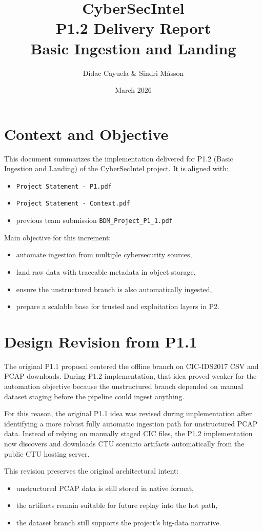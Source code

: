\documentclass[11pt,a4paper]{article}
\title{CyberSecIntel \\ P1.2 Delivery Report \\ Basic Ingestion and Landing}
\author{D\'idac Cayuela \& Sindri Másson}
\date{March 2026}
\begin{document}
\maketitle

\section{Context and Objective}
This document summarizes the implementation delivered for P1.2 (Basic Ingestion and Landing) of the CyberSecIntel project.
It is aligned with:
\begin{itemize}[leftmargin=1.5em]
  \item \texttt{Project Statement - P1.pdf}
  \item \texttt{Project Statement - Context.pdf}
  \item previous team submission \texttt{BDM\_Project\_P1\_1.pdf}
\end{itemize}

Main objective for this increment:
\begin{itemize}[leftmargin=1.5em]
  \item automate ingestion from multiple cybersecurity sources,
  \item land raw data with traceable metadata in object storage,
  \item ensure the unstructured branch is also automatically ingested,
  \item prepare a scalable base for trusted and exploitation layers in P2.
\end{itemize}

\section{Design Revision from P1.1}
The original P1.1 proposal centered the offline branch on CIC-IDS2017 CSV and PCAP downloads. During P1.2 implementation, that idea proved weaker for the automation objective because the unstructured branch depended on manual dataset staging before the pipeline could ingest anything.

For this reason, the original P1.1 idea was revised during implementation after identifying a more robust fully automatic ingestion path for unstructured PCAP data. Instead of relying on manually staged CIC files, the P1.2 implementation now discovers and downloads CTU scenario artifacts automatically from the public CTU hosting server.

This revision preserves the original architectural intent:
\begin{itemize}[leftmargin=1.5em]
  \item unstructured PCAP data is still stored in native format,
  \item the artifacts remain suitable for future replay into the hot path,
  \item the dataset branch still supports the project's big-data narrative.
\end{itemize}
\end{document}

